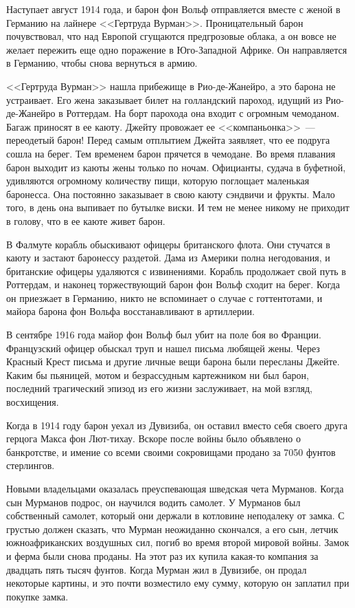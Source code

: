 \documentclass[12pt,a4paper,twoside,openany,svgnames]{memoir}
\begin{document}
Наступает август 1914 года, и барон фон Вольф отправляется вместе с женой в Германию на лайнере <<Гертруда Вурман>>. Проницательный барон почувствовал, что над Европой сгущаются предгрозовые облака, а он вовсе не желает пережить еще одно поражение в Юго-Западной Африке. Он направляется в Германию, чтобы снова вернуться в армию.

<<Гертруда Вурман>> нашла прибежище в Рио-де-Жанейро, а это барона не устраивает. Его жена заказывает билет на голландский пароход, идущий из Рио-де-Жанейро в Роттердам. На борт парохода она входит с огромным чемоданом. Багаж приносят в ее каюту. Джейту провожает ее <<компаньонка>>~--- переодетый барон! Перед самым отплытием Джейта заявляет, что ее подруга сошла на берег. Тем временем барон прячется в чемодане. Во время плавания барон выходит из каюты жены только по ночам. Официанты, судача в буфетной, удивляются огромному количеству пищи, которую поглощает маленькая баронесса. Она постоянно заказывает в свою каюту сэндвичи и фрукты. Мало того, в день она выпивает по бутылке виски. И тем не менее никому не приходит в голову, что в ее каюте живет барон.

В Фалмуте корабль обыскивают офицеры британского флота. Они стучатся в каюту и застают баронессу раздетой. Дама из Америки полна негодования, и британские офицеры удаляются с извинениями. Корабль продолжает свой путь в Роттердам, и наконец торжествующий барон фон Вольф сходит на берег. Когда он приезжает в Германию, никто не вспоминает о случае с готтентотами, и майора барона фон Вольфа восстанавливают в артиллерии.

В сентябре 1916 года майор фон Вольф был убит на поле боя во Франции. Французский офицер обыскал труп и нашел письма любящей жены. Через Красный Крест письма и другие личные вещи барона были пересланы Джейте. Каким бы пьяницей, мотом и безрассудным картежником ни был барон, последний трагический эпизод из его жизни заслуживает, на мой взгляд, восхищения.

Когда в 1914 году барон уехал из Дувизиба, он оставил вместо себя своего друга герцога Макса фон Лют-тихау. Вскоре после войны было объявлено о банкротстве, и имение со всеми своими сокровищами продано за 7050 фунтов стерлингов.

Новыми владельцами оказалась преуспевающая шведская чета Мурманов. Когда сын Мурманов подрос, он научился водить самолет. У Мурманов был собственный самолет, который они держали в котловине неподалеку от замка. С грустью должен сказать, что Мурман неожиданно скончался, а его сын, летчик южноафриканских воздушных сил, погиб во время второй мировой войны. Замок и ферма были снова проданы. На этот раз их купила какая-то компания за двадцать пять тысяч фунтов. Когда Мурман жил в Дувизибе, он продал некоторые картины, и это почти возместило ему сумму, которую он заплатил при покупке замка.
\end{document}
